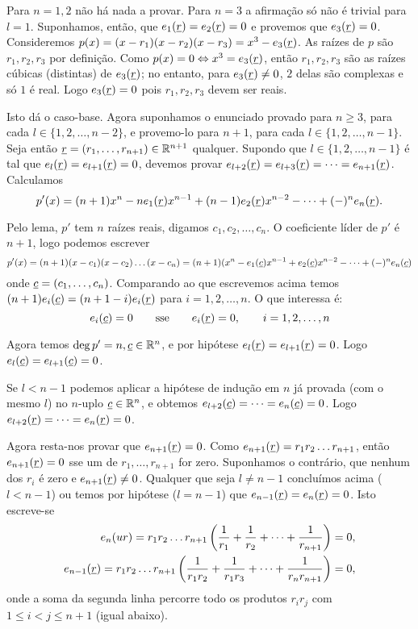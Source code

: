 \documentclass[repertorio-solutions-1.tex]{subfiles}
\renewcommand*{\u}[1]{\ensuremath{\uline{#1}}}
\begin{document}
\begin{solution}
Para $n=1,2$ não há nada a provar.
Para $n=3$ a afirmação só não é trivial para $l=1$.
Suponhamos, então, que $e_1(\u{r})=e_2(\u{r})=0$ e provemos que $e_3(\u{r})=0$.
Consideremos $p(x)=(x-r_1)(x-r_2)(x-r_3)=x^3-e_3(\u{r})$.
As raízes de $p$ são $r_1,r_2,r_3$ por definição.
Como $p(x)=0\Leftrightarrow x^3=e_3(\u{r})$,
então $r_1,r_2,r_3$ são as raízes cúbicas (distintas) de $e_3(\u{r})$;
no entanto, para $e_3(\u{r})\neq 0$, $2$ delas são complexas e só $1$ é real.
Logo $e_3(\u{r})=0$ pois $r_1,r_2,r_3$ devem ser reais.

Isto dá o caso-base. Agora suponhamos o enunciado provado para $n\geq 3$,
para cada $l\in\{1,2,\dots,n-2\}$, e provemo-lo para $n+1$,
para cada $l\in\{1,2,\dots,n-1\}$.
Seja então $\u{r}=(r_1,\dots,r_{n+1})\in\mathbb{R}^{n+1}$ qualquer.
Supondo que $l\in\{1,2,\dots,n-1\}$ é tal que $e_l(\u{r})=e_{l+1}(\u{r})=0$,
devemos provar $e_{l+2}(\u{r})=e_{l+3}(\u{r})=\dots=e_{n+1}(\u{r})$.
Calculamos
\begin{equation*}
p'(x)=(n+1)x^n-ne_1(\u{r})x^{n-1}+(n-1)e_2(\u{r})x^{n-2}
-\dots+(-)^ne_n(\u{r}).
\end{equation*}

Pelo lema, $p'$ tem $n$ raízes reais, digamos $c_1,c_2,\dots,c_n$.
O coeficiente líder de $p'$ é $n+1$, logo podemos escrever
\begin{equation*}
p'(x)=(n+1)(x-c_1)(x-c_2)\dots(x-c_n)
=(n+1)(x^n-e_1(\u{c})x^{n-1}+e_2(\u{c})x^{n-2}-\dots+(-)^ne_n(\u{c})
\end{equation*}
onde $\u{c}=(c_1,\dots,c_n)$. Comparando ao que escrevemos acima temos
$(n+1)e_i(\u{c})=(n+1-i)e_i(\u{r})$ para $i=1,2,\dots,n$.
O que interessa é:
\begin{equation*}
e_i(\u{c})=0
\qquad \text{sse} \qquad
e_i(\u{r})=0,
\qquad i=1,2,\dots,n
\end{equation*}

Agora temos $\deg p'=n,\u{c}\in\mathbb{R}^n$, e por hipótese
$e_l(\u{r})=e_{l+1}(\u{r})=0$.
Logo $e_l(\u{c})=e_{l+1}(\u{c})=0$.

Se $l<n-1$ podemos aplicar a hipótese de indução em $n$ já provada
(com o mesmo $l$) no $n$-uplo $\u{c}\in\mathbb{R}^n$, e obtemos
$e_{l+2}(\u{c})=\dots=e_n(\u{c})=0$.
Logo $e_{l+2}(\u{r})=\dots=e_n(\u{r})=0$.

Agora resta-nos provar que $e_{n+1}(\u{r})=0$.
Como $e_{n+1}(\u{r})=r_1r_2\dots r_{n+1}$, então $e_{n+1}(\u{r})=0$
sse um de $r_1,\dots,r_{n+1}$ for zero.
Suponhamos o contrário, que nenhum dos $r_i$ é zero e
$e_{n+1}(\u{r})\neq 0$.
Qualquer que seja $l\neq n-1$ concluímos acima ($l<n-1$) ou temos
por hipótese ($l=n-1$) que $e_{n-1}(\u{r})=e_n(\u{r})=0$.
Isto escreve-se
\begin{align*}
e_n(u{r})=r_1r_2\dots r_{n+1}\left(\frac{1}{r_1}+\frac{1}{r_2}
+\dots+\frac{1}{r_{n+1}}\right)=0, \\
e_{n-1}(\u{r})=r_1r_2\dots r_{n+1}\left(\frac{1}{r_1r_2}+
\frac{1}{r_1r_3}+\dots+\frac{1}{r_nr_{n+1}}\right)=0,
\end{align*}
onde a soma da segunda linha percorre todo os produtos $r_ir_j$
com $1\leq i<j\leq n+1$ (igual abaixo).


\end{solution}
\end{document}
